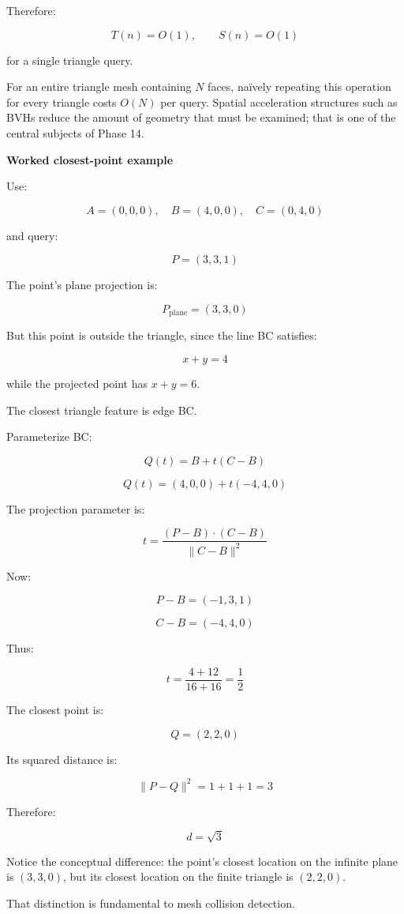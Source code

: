 Therefore:

\[
T(n)=O(1),\qquad S(n)=O(1)
\]

for a single triangle query.

For an entire triangle mesh containing \(N\) faces, naïvely repeating this operation for every triangle costs \(O(N)\) per query. Spatial acceleration structures such as BVHs reduce the amount of geometry that must be examined; that is one of the central subjects of Phase 14.

\textbf{Worked closest-point example}

Use:

\[
A=(0,0,0),\quad B=(4,0,0),\quad C=(0,4,0)
\]

and query:

\[
P=(3,3,1)
\]

The point's plane projection is:

\[
P_{\mathrm{plane}}=(3,3,0)
\]

But this point is outside the triangle, since the line BC satisfies:

\[
x+y=4
\]

while the projected point has \(x+y=6\).

The closest triangle feature is edge BC.

Parameterize BC:

\[
Q(t)=B+t(C-B)
\]

\[
Q(t)=(4,0,0)+t(-4,4,0)
\]

The projection parameter is:

\[
t=\frac{(P-B)\cdot(C-B)} {\|C-B\|^2}
\]

Now:

\[
P-B=(-1,3,1)
\]

\[
C-B=(-4,4,0)
\]

Thus:

\[
t=\frac{4+12}{16+16}=\frac12
\]

The closest point is:

\[
\boxed{Q=(2,2,0)}
\]

Its squared distance is:

\[
\|P-Q\|^2=1+1+1=3
\]

Therefore:

\[
\boxed{d=\sqrt3}
\]

Notice the conceptual difference: the point's closest location on the infinite plane is \((3,3,0)\), but its closest location on the finite triangle is \((2,2,0)\).

That distinction is fundamental to mesh collision detection.

